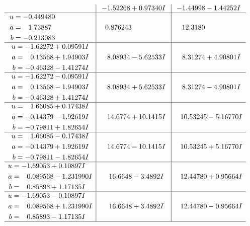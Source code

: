 \documentclass[1p]{elsarticle_modified}
\theoremstyle{definition}
\begin{document}
$$\begin{array}{c|c|c}
 & -1.52268 + 0.97340 I & -1.44998 - 1.44252 I \\ \hline\begin{aligned}
u &= -0.449480\phantom{ +0.000000I} \\
a &= \phantom{-}1.73887\phantom{ +0.000000I} \\
b &= -0.213083\phantom{ +0.000000I}\end{aligned}
 & \phantom{-}0.876243\phantom{ +0.000000I} & \phantom{-}12.3180\phantom{ +0.000000I} \\ \hline\begin{aligned}
u &= -1.62272 + 0.09591 I \\
a &= \phantom{-}0.13568 + 1.94903 I \\
b &= -0.46328 - 1.41274 I\end{aligned}
 & \phantom{-}8.08934 - 5.62533 I & \phantom{-}8.31274 + 4.90801 I \\ \hline\begin{aligned}
u &= -1.62272 - 0.09591 I \\
a &= \phantom{-}0.13568 - 1.94903 I \\
b &= -0.46328 + 1.41274 I\end{aligned}
 & \phantom{-}8.08934 + 5.62533 I & \phantom{-}8.31274 - 4.90801 I \\ \hline\begin{aligned}
u &= \phantom{-}1.66085 + 0.17438 I \\
a &= -0.14379 - 1.92619 I \\
b &= -0.79811 + 1.82654 I\end{aligned}
 & \phantom{-}14.6774 + 10.1415 I & \phantom{-}10.53245 - 5.16770 I \\ \hline\begin{aligned}
u &= \phantom{-}1.66085 - 0.17438 I \\
a &= -0.14379 + 1.92619 I \\
b &= -0.79811 - 1.82654 I\end{aligned}
 & \phantom{-}14.6774 - 10.1415 I & \phantom{-}10.53245 + 5.16770 I \\ \hline\begin{aligned}
u &= -1.69053 + 0.10897 I \\
a &= \phantom{-}0.089568 - 1.231990 I \\
b &= \phantom{-}0.85893 + 1.17135 I\end{aligned}
 & \phantom{-}16.6648 - 3.4892 I & \phantom{-}12.44780 + 0.95664 I \\ \hline\begin{aligned}
u &= -1.69053 - 0.10897 I \\
a &= \phantom{-}0.089568 + 1.231990 I \\
b &= \phantom{-}0.85893 - 1.17135 I\end{aligned}
 & \phantom{-}16.6648 + 3.4892 I & \phantom{-}12.44780 - 0.95664 I\\
 \hline 
 \end{array}$$\newpage\newpage\renewcommand{\arraystretch}{1}
\end{document}
